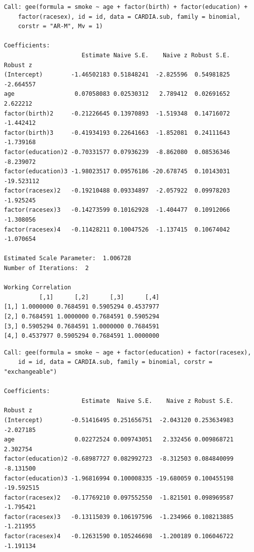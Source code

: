 \documentclass{BeamerTemplate}
\begin{document}
\begin{refsection}
\begin{frame}[fragile]{}
{\tiny
\begin{verbatim}
Call: gee(formula = smoke ~ age + factor(birth) + factor(education) + 
    factor(racesex), id = id, data = CARDIA.sub, family = binomial, 
    corstr = "AR-M", Mv = 1)

Coefficients:
                      Estimate Naive S.E.    Naive z Robust S.E.   Robust z
(Intercept)        -1.46502183 0.51848241  -2.825596  0.54981825  -2.664557
age                 0.07058083 0.02530312   2.789412  0.02691652   2.622212
factor(birth)2     -0.21226645 0.13970893  -1.519348  0.14716072  -1.442412
factor(birth)3     -0.41934193 0.22641663  -1.852081  0.24111643  -1.739168
factor(education)2 -0.70331577 0.07936239  -8.862080  0.08536346  -8.239072
factor(education)3 -1.98023517 0.09576186 -20.678745  0.10143031 -19.523112
factor(racesex)2   -0.19210488 0.09334897  -2.057922  0.09978203  -1.925245
factor(racesex)3   -0.14273599 0.10162928  -1.404477  0.10912066  -1.308056
factor(racesex)4   -0.11428211 0.10047526  -1.137415  0.10674042  -1.070654

Estimated Scale Parameter:  1.006728
Number of Iterations:  2

Working Correlation
          [,1]      [,2]      [,3]      [,4]
[1,] 1.0000000 0.7684591 0.5905294 0.4537977
[2,] 0.7684591 1.0000000 0.7684591 0.5905294
[3,] 0.5905294 0.7684591 1.0000000 0.7684591
[4,] 0.4537977 0.5905294 0.7684591 1.0000000
\end{verbatim}
}
\end{frame}

\begin{frame}[fragile]{}
{\tiny
\begin{verbatim}
Call: gee(formula = smoke ~ age + factor(education) + factor(racesex), 
    id = id, data = CARDIA.sub, family = binomial, corstr = "exchangeable")

Coefficients:
                      Estimate  Naive S.E.    Naive z Robust S.E.   Robust z
(Intercept)        -0.51416495 0.251656751  -2.043120 0.253634983  -2.027185
age                 0.02272524 0.009743051   2.332456 0.009868721   2.302754
factor(education)2 -0.68987727 0.082992723  -8.312503 0.084840099  -8.131500
factor(education)3 -1.96816994 0.100008335 -19.680059 0.100455198 -19.592515
factor(racesex)2   -0.17769210 0.097552550  -1.821501 0.098969587  -1.795421
factor(racesex)3   -0.13115039 0.106197596  -1.234966 0.108213885  -1.211955
factor(racesex)4   -0.12631590 0.105246698  -1.200189 0.106046722  -1.191134


\end{verbatim}}
\end{frame}
\end{refsection}
\end{document}
